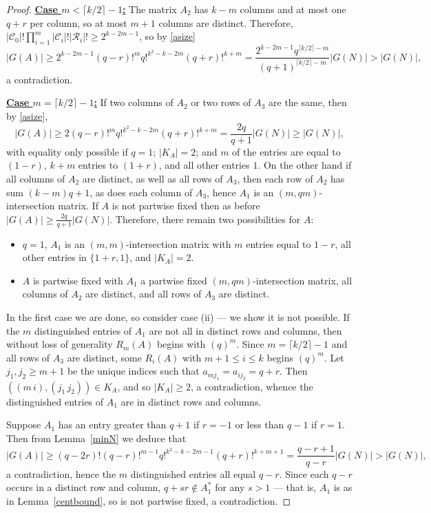 \documentclass[10pt,a4paper]{amsart}
\begin{document}
\begin{proof}
\vspace{11pt}\noindent \underline{\textbf{Case $m<\lceil k/2\rceil -1$:}} The matrix $A_2$ has $k-m$ columns and at most one $q+r$ per column, so at most $m+1$ columns are distinct. Therefore, $|\mathcal{C}_0|!\prod_{i=1}^{m}|\mathcal{C}_i|!|\mathcal{R}_i|!\geq 2^{k-2m-1}$, so by \eqref{asize} $$|G(A)|\geq 2^{k-2m-1}(q-r)!^mq!^{k^2-k-2m}(q+r)!^{k+m}=\frac{2^{k-2m-1}q^{\lceil k/2\rceil-m}}{(q+1)^{\lceil k/2\rceil-m}}|G(N)|>|G(N)|,$$ a contradiction.

\vspace{11pt}\noindent \underline{\textbf{Case $m=\lceil k/2\rceil -1$:}} If two columns of $A_2$ or two rows of $A_3$ are the same, then by \eqref{asize}, $$|G(A)|\geq2(q-r)!^mq!^{k^2-k-2m}(q+r)!^{k+m}=\frac{2q}{q+1}|G(N)|\geq |G(N)|,$$ with equality only possible if $q=1$; $|K_A|=2$; and $m$ of the entries are equal to $(1-r)$, $k+m$ entries to $(1+r)$, and all other entries $1$. 
 On the other hand if all columns of $A_2$ are distinct, as well as all rows of $A_3$, then each row of $A_2$ has sum $(k-m)q+1$, as does each column of $A_3$, hence $A_1$ is an $(m,qm)$-intersection matrix. If $A$ is not partwise fixed then as before $|G(A)|\geq\frac{2q}{q+1}|G(N)|.$ Therefore, there remain two possibilities for $A$:
\begin{itemize}
    \item[(i)] $q=1$, $A_1$ is an $(m,m)$-intersection matrix with $m$ entries equal to $1-r$, all other entries in $\{1+r,1\}$,  and $|K_A|=2$.
    \item[(ii)] $A$ is partwise fixed with $A_1$ a partwise fixed $(m,qm)$-intersection matrix, all columns of $A_2$ are distinct, and all rows of $A_3$ are distinct.

\end{itemize}
In the first case we are done, so consider case (ii) --- we show it is not possible. If the $m$ distinguished entries of $A_1$ are not all in distinct rows and columns, then without loss of generality $R_{m}(A)$ begins with $(q)^m$. Since $m=\lceil k/2\rceil-1$ and all rows of $A_3$ are distinct, some $R_i(A)$ with $m+1\leq i\leq k$ begins $(q)^m$. Let $j_1,j_2\geq m+1$ be the unique indices such that $a_{mj_1}=a_{ij_2}=q+r$. Then $((m\, i), (j_1\,j_2))\in K_A$, and so $|K_A|\geq2$, a contradiction, whence the distinguished entries of $A_1$ are in distinct rows and columns.

Suppose $A_1$ has an entry greater than $q+1$ if $r=-1$ or less than $q-1$ if $r=1$. Then from Lemma~\ref{minN} we deduce that $$|G(A)|\geq (q-2r)!(q-r)!^{m-1}q!^{k^2-k-2m-1}(q+r)!^{k+m+1}=\frac{q-r+1}{q-r}|G(N)|>|G(N)|,$$
a contradiction, hence the $m$ distinguished entries all equal $q-r$. Since each $q-r$ occurs in a distinct row and column, $q+sr\not\in A_1^*$ for any $s>1$ --- that is, $A_1$ is as in Lemma~\ref{centbound}, so is not partwise fixed, a contradiction.
\end{proof}
\end{document}
